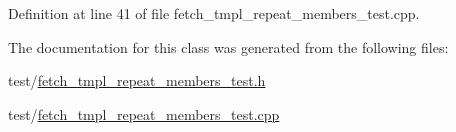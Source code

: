 Definition at line 41 of file fetch\+\_\+tmpl\+\_\+repeat\+\_\+members\+\_\+test.\+cpp.



The documentation for this class was generated from the following files\+:\begin{DoxyCompactItemize}
\item 
test/\hyperlink{fetch__tmpl__repeat__members__test_8h}{fetch\+\_\+tmpl\+\_\+repeat\+\_\+members\+\_\+test.\+h}\item 
test/\hyperlink{fetch__tmpl__repeat__members__test_8cpp}{fetch\+\_\+tmpl\+\_\+repeat\+\_\+members\+\_\+test.\+cpp}\end{DoxyCompactItemize}
